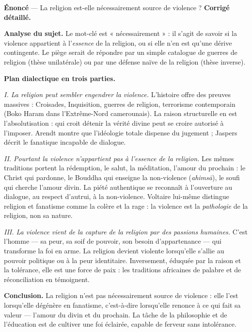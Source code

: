 \documentclass[11pt]{article}
\begin{document}
\begin{exoresolu}
\textbf{Énoncé} — La religion est-elle nécessairement source de violence ?
\tcblower
\textbf{Corrigé détaillé.}\par
\textbf{Analyse du sujet.} Le mot-clé est « nécessairement » : il s'agit de savoir si la violence appartient à l'\emph{essence} de la religion, ou si elle n'en est qu'une dérive contingente. Le piège serait de répondre par un simple catalogue de guerres de religion (thèse unilatérale) ou par une défense naïve de la religion (thèse inverse).\par
\textbf{Plan dialectique en trois parties.}\par
\emph{I. La religion peut sembler engendrer la violence.} L'histoire offre des preuves massives : Croisades, Inquisition, guerres de religion, terrorisme contemporain (Boko Haram dans l'Extrême-Nord camerounais). La raison structurelle en est l'absolutisation : qui croit détenir la vérité divine peut se croire autorisé à l'imposer. Arendt montre que l'idéologie totale dispense du jugement ; Jaspers décrit le fanatique incapable de dialogue.\par
\emph{II. Pourtant la violence n'appartient pas à l'essence de la religion.} Les mêmes traditions portent la rédemption, le salut, la méditation, l'amour du prochain : le Christ qui pardonne, le Bouddha qui enseigne la non-violence (\emph{ahimsā}), le soufi qui cherche l'amour divin. La piété authentique se reconnaît à l'ouverture au dialogue, au respect d'autrui, à la non-violence. Voltaire lui-même distingue religion et fanatisme comme la colère et la rage : la violence est la \emph{pathologie} de la religion, non sa nature.\par
\emph{III. La violence vient de la capture de la religion par des passions humaines.} C'est l'homme — sa peur, sa soif de pouvoir, son besoin d'appartenance — qui transforme la foi en arme. La religion devient violente lorsqu'elle s'allie au pouvoir politique ou à la peur identitaire. Inversement, éduquée par la raison et la tolérance, elle est une force de paix : les traditions africaines de palabre et de réconciliation en témoignent.\par
\textbf{Conclusion.} La religion n'est pas nécessairement source de violence : elle l'est lorsqu'elle dégénère en fanatisme, c'est-à-dire lorsqu'elle renonce à ce qui fait sa valeur — l'amour du divin et du prochain. La tâche de la philosophie et de l'éducation est de cultiver une foi éclairée, capable de ferveur sans intolérance.
\end{exoresolu}
\end{document}
